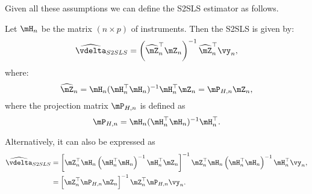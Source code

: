 Given all these assumptions we can define the S2SLS estimator as follows.

\begin{definition}
Let $\mH_n$ be the matrix $(n\times p)$ of instruments. Then the S2SLS is given by:
\begin{equation}\label{eq:2sls_estimator}
  \widehat{\vdelta}_{S2SLS} =  \left(\widehat{\mZ}_n^\top\mZ_n\right)^{-1}\widehat{\mZ}^\top_n\vy_n,
\end{equation}
%
where:
\begin{equation}\label{eq:2sls_first_stage}
\widehat{\mZ}_n = \mH_n(\mH^\top_n\mH_n)^{-1}\mH^\top_n\mZ_n = \mP_{H, n}\mZ_n,
\end{equation}
%
where the projection matrix $\mP_{H, n}$ is defined as
\begin{equation}\label{eq:Phn}
\mP_{H, n}= \mH_n(\mH^\top_n\mH_n)^{-1}\mH^\top_n.
\end{equation}

Alternatively, it can also be expressed as
\begin{equation}\label{eq:2sls_first_stage2}
\begin{aligned}
\widehat{\vdelta}_{S2SLS}  & =\left[\mZ_n^\top \mH_n\left(\mH_n^\top\mH_n\right)^{-1}\mH_n^\top\mZ_n\right]^{-1}\mZ_n^\top \mH_n\left(\mH_n^\top\mH_n\right)^{-1}\mH_n^\top\vy_n, \\
 & = \left[\mZ_n^\top\mP_{H,n}\mZ_n\right]^{-1}\mZ_n^\top\mP_{H,n}\vy_n. 
\end{aligned}
\end{equation}
\end{definition}

